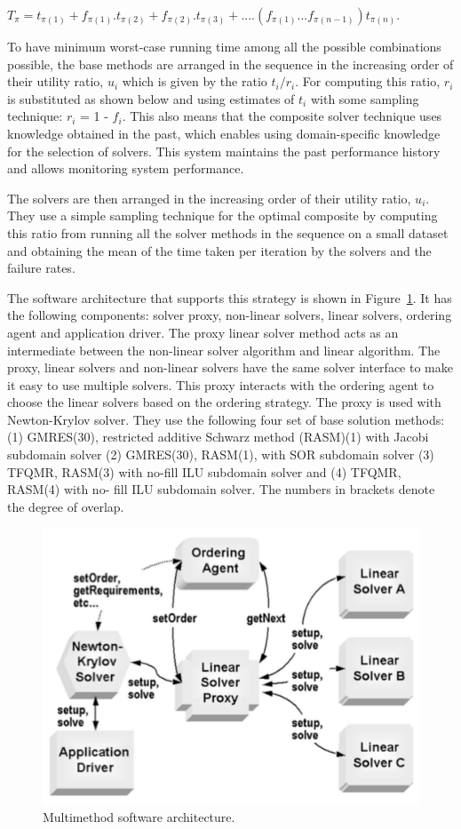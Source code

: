 $T_\pi = t_{\pi(1)} + f_{\pi(1)}.t_{\pi(2)} + f_{\pi(2)}.t_{\pi(3)} + ....(f_{\pi(1)}... f_{\pi(n-1)}) t_{\pi(n)}. $

To have minimum worst-case running time among all the possible combinations possible, the base methods are arranged in the sequence in the increasing order of their utility ratio, $u_i$ which is given by the ratio $t_i/r_i$. For computing this ratio, $r_i$ is substituted as shown below and using estimates of $t_i$ with some sampling technique: $r_i$ = 1 - $f_i$. This also means that the composite solver technique uses knowledge obtained in the past, which enables using domain-specific knowledge for the selection of solvers. This system maintains the past performance history and allows monitoring system performance.

The solvers are then arranged in the increasing order of their utility ratio, $u_i$. They use a simple sampling technique for the optimal composite by computing this ratio from running all the solver methods in the sequence on a small dataset and obtaining the mean of the time taken per iteration by the solvers and the failure rates.

The software architecture that supports this strategy is shown in Figure~\ref{fig:composite_multimtdarchitecture}. It has the following components: solver proxy, non-linear solvers, linear solvers, ordering agent and application driver. The proxy linear solver method acts as an intermediate between the non-linear solver algorithm and linear algorithm. The proxy, linear solvers and non-linear solvers have the same solver interface to make it easy to use multiple solvers. This proxy interacts with the ordering agent to choose the linear solvers based on the ordering strategy. The proxy is used with Newton-Krylov solver. They use the following four set of base solution methods: (1) GMRES(30), restricted additive Schwarz method (RASM)(1) with Jacobi subdomain solver (2) GMRES(30), RASM(1), with SOR subdomain solver (3) TFQMR, RASM(3) with no-fill ILU subdomain solver and (4) TFQMR, RASM(4) with no- fill ILU subdomain solver. The numbers in brackets denote the degree of overlap. 

\begin{figure}[h]
\begin{center}
 \includegraphics[width=0.7\linewidth]{figures/composite_multimtdarchitecture.pdf}
\end{center}
\caption{Multimethod software architecture.\label{fig:composite_multimtdarchitecture}}
\end{figure}


